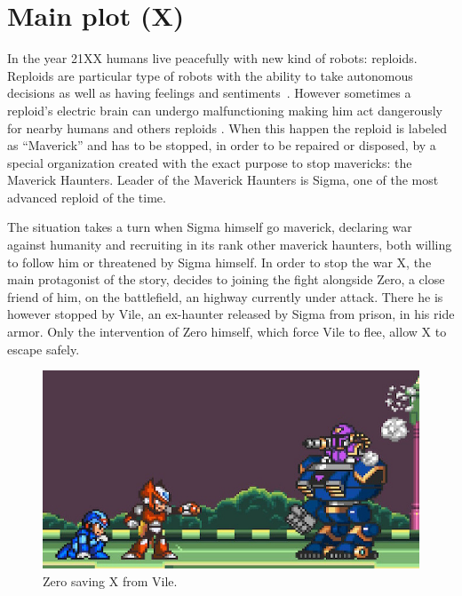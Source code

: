 \section[Main plot]{Main plot (X)}
In the year 21XX humans live peacefully with new kind of robots: reploids. Reploids are particular type of robots with the ability to take autonomous decisions as well as having feelings and sentiments~\cite{Xcoll1:Manual_X1}. However sometimes  a reploid's electric brain can undergo  malfunctioning making him act dangerously for nearby humans and others reploids . When this happen the reploid is labeled as ``Maverick'' and has to be stopped, in order to be repaired or disposed, by a special organization created with the exact purpose to stop mavericks: the Maverick Haunters. Leader of the Maverick Haunters is Sigma, one of the most advanced reploid of the time. 

The situation takes a turn when Sigma himself go maverick, declaring war against humanity and recruiting in its rank other maverick haunters, both willing to follow him or threatened by Sigma himself. In order to stop the war X, the main protagonist of the story, decides to joining the fight alongside Zero, a close friend of him, on the battlefield, an highway currently under attack. There he is however stopped by Vile, an ex-haunter released by Sigma from prison, in his ride armor. Only the intervention of Zero himself, which force Vile to flee, allow X to escape safely.
\begin{figure}[htp]
	\centering
	\includegraphics[width=0.5\linewidth]{figures/X1/Highway_end.jpg}
	\caption{Zero saving X from Vile.}
\end{figure}

